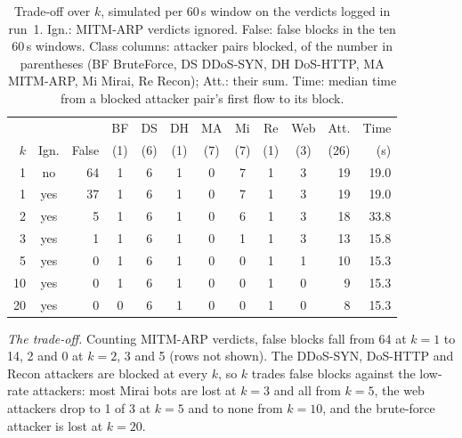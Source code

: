 \begin{table}[t]
\centering
\caption{Trade-off over $k$, simulated per 60\,s window on the verdicts logged in run~1. Ign.: MITM-ARP verdicts ignored. False: false blocks in the ten 60\,s windows. Class columns: attacker pairs blocked, of the number in parentheses (BF BruteForce, DS DDoS-SYN, DH DoS-HTTP, MA MITM-ARP, Mi Mirai, Re Recon); Att.: their sum. Time: median time from a blocked attacker pair's first flow to its block.}
\label{tab:kcurve}
\footnotesize
\setlength{\tabcolsep}{2.4pt}
\begin{tabular}{rcrcccccccrr}
\hline
 & & & BF & DS & DH & MA & Mi & Re & Web & Att. & Time \\
$k$ & Ign. & False & (1) & (6) & (1) & (7) & (7) & (1) & (3) & (26) & (s) \\
\hline
1  & no  & 64 & 1 & 6 & 1 & 0 & 7 & 1 & 3 & 19 & 19.0 \\
1  & yes & 37 & 1 & 6 & 1 & 0 & 7 & 1 & 3 & 19 & 19.0 \\
2  & yes &  5 & 1 & 6 & 1 & 0 & 6 & 1 & 3 & 18 & 33.8 \\
3  & yes &  1 & 1 & 6 & 1 & 0 & 1 & 1 & 3 & 13 & 15.8 \\
5  & yes &  0 & 1 & 6 & 1 & 0 & 0 & 1 & 1 & 10 & 15.3 \\
10 & yes &  0 & 1 & 6 & 1 & 0 & 0 & 1 & 0 &  9 & 15.3 \\
20 & yes &  0 & 0 & 6 & 1 & 0 & 0 & 1 & 0 &  8 & 15.3 \\
\hline
\end{tabular}
\end{table}

\emph{The trade-off.} Counting MITM-ARP verdicts, false blocks fall from 64 at $k=1$ to 14, 2 and 0 at $k=2$, 3 and 5 (rows not shown). The DDoS-SYN, DoS-HTTP and Recon attackers are blocked at every $k$, so $k$ trades false blocks against the low-rate attackers: most Mirai bots are lost at $k=3$ and all from $k=5$, the web attackers drop to 1 of 3 at $k=5$ and to none from $k=10$, and the brute-force attacker is lost at $k=20$.

